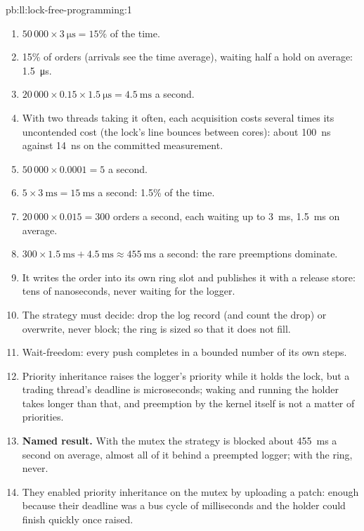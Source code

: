\begin{solution}{pb:ll:lock-free-programming:1}
\begin{enumerate}
\item $50\,000 \times \qty{3}{\micro\second} = 15\%$ of the time.
\item 15\% of orders (arrivals see the time average), waiting half a hold on average: \qty{1.5}{\micro\second}.
\item $20\,000 \times 0.15 \times \qty{1.5}{\micro\second} = \qty{4.5}{\milli\second}$ a second.
\item With two threads taking it often, each acquisition costs several times its uncontended cost (the lock's line bounces
between cores): about \qty{100}{\nano\second} against \qty{14}{\nano\second} on the committed measurement.
\item $50\,000 \times 0.0001 = 5$ a second.
\item $5 \times \qty{3}{\milli\second} = \qty{15}{\milli\second}$ a second: 1.5\% of the time.
\item $20\,000 \times 0.015 = 300$ orders a second, each waiting up to \qty{3}{\milli\second}, \qty{1.5}{\milli\second} on
average.
\item $300 \times \qty{1.5}{\milli\second} + \qty{4.5}{\milli\second} \approx \qty{455}{\milli\second}$ a second: the rare
preemptions dominate.
\item It writes the order into its own ring slot and publishes it with a release store: tens of nanoseconds, never waiting for
the logger.
\item The strategy must decide: drop the log record (and count the drop) or overwrite, never block; the ring is sized so that it
does not fill.
\item Wait-freedom: every push completes in a bounded number of its own steps.
\item Priority inheritance raises the logger's priority while it holds the lock, but a trading thread's deadline is microseconds;
waking and running the holder takes longer than that, and preemption by the kernel itself is not a matter of priorities.
\item \textbf{Named result.} With the mutex the strategy is blocked about \qty{455}{\milli\second} a second on average, almost all
of it behind a preempted logger; with the ring, never.
\item They enabled priority inheritance on the mutex by uploading a patch: enough because their deadline was a bus cycle of
milliseconds and the holder could finish quickly once raised.

\end{enumerate}
\end{solution}

